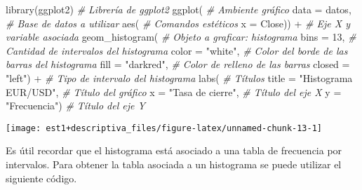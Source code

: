 \documentclass[
]{book}
\newenvironment{Shaded}{\begin{snugshade}}{\end{snugshade}}
\newcommand{\AttributeTok}[1]{\textcolor[rgb]{0.77,0.63,0.00}{#1}}
\newcommand{\CommentTok}[1]{\textcolor[rgb]{0.56,0.35,0.01}{\textit{#1}}}
\newcommand{\DecValTok}[1]{\textcolor[rgb]{0.00,0.00,0.81}{#1}}
\newcommand{\FunctionTok}[1]{\textcolor[rgb]{0.00,0.00,0.00}{#1}}
\newcommand{\NormalTok}[1]{#1}
\newcommand{\OtherTok}[1]{\textcolor[rgb]{0.56,0.35,0.01}{#1}}
\newcommand{\SpecialCharTok}[1]{\textcolor[rgb]{0.00,0.00,0.00}{#1}}
\newcommand{\StringTok}[1]{\textcolor[rgb]{0.31,0.60,0.02}{#1}}
\theoremstyle{definition}
\theoremstyle{definition}
\theoremstyle{definition}
\theoremstyle{definition}
\theoremstyle{remark}
\begin{document}
\begin{Shaded}
\begin{Highlighting}[]
\FunctionTok{library}\NormalTok{(ggplot2) }\CommentTok{\# Librería de ggplot2}
\FunctionTok{ggplot}\NormalTok{( }\CommentTok{\# Ambiente gráfico}
  \AttributeTok{data =}\NormalTok{ datos, }\CommentTok{\# Base de datos a utilizar}
       \FunctionTok{aes}\NormalTok{( }\CommentTok{\# Comandos estéticos}
         \AttributeTok{x =}\NormalTok{ Close)) }\SpecialCharTok{+} \CommentTok{\# Eje X y variable asociada }
  \FunctionTok{geom\_histogram}\NormalTok{( }\CommentTok{\# Objeto a graficar: histograma}
    \AttributeTok{bins =} \DecValTok{13}\NormalTok{, }\CommentTok{\# Cantidad de intervalos del histograma}
    \AttributeTok{color =} \StringTok{"white"}\NormalTok{, }\CommentTok{\# Color del borde de las barras del histograma}
    \AttributeTok{fill =} \StringTok{"darkred"}\NormalTok{, }\CommentTok{\# Color de relleno de las barras}
    \AttributeTok{closed =} \StringTok{"left"}\NormalTok{) }\SpecialCharTok{+} \CommentTok{\# Tipo de intervalo del histograma}
  \FunctionTok{labs}\NormalTok{( }\CommentTok{\# Títulos}
    \AttributeTok{title =} \StringTok{"Histograma EUR/USD"}\NormalTok{, }\CommentTok{\# Título del gráfico}
    \AttributeTok{x =} \StringTok{"Tasa de cierre"}\NormalTok{, }\CommentTok{\# Título del eje X}
    \AttributeTok{y =} \StringTok{"Frecuencia"}\NormalTok{) }\CommentTok{\# Título del eje Y}
\end{Highlighting}
\end{Shaded}

\begin{center}\texttt{[image: est1+descriptiva\_files/figure-latex/unnamed-chunk-13-1]} \end{center}

Es útil recordar que el histograma está asociado a una tabla de frecuencia por intervalos. Para obtener la tabla asociada a un histograma se puede utilizar el siguiente código.

\begin{Shaded}
\end{Shaded}
\end{document}

